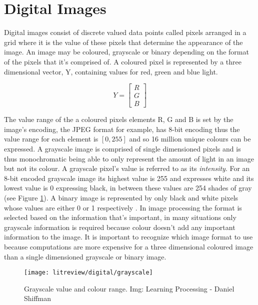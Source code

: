 \section{Digital Images}
\label{section:digital_image}
Digital images consist of discrete valued data points called pixels arranged in a grid where it is the value of these pixels that determine the appearance of the image. An image may be coloured, grayscale or binary depending on the format of the pixels that it's comprised of. A coloured pixel is represented by a three dimensional vector, Y, containing values for red, green and blue light.

\begin{equation}
  Y = \begin{bmatrix}
    R \\ G \\ B
  \end{bmatrix}
\end{equation}

The value range of the a coloured pixels elements R, G and B is set by the image's encoding, the JPEG format for example, has 8-bit encoding thus the value range for each element is $[0, 255]$ and so 16 million unique colours can be expressed. A grayscale image is comprised of single dimensioned pixels and is thus monochromatic being able to only represent the amount of light in an image but not its colour. A grayscale pixel's value is referred to as its \emph{intensity}. For an 8-bit encoded grayscale image its highest value is 255 and expresses white and its lowest value is 0 expressing black, in between these values are 254 shades of gray (see Figure \ref{fig:grayscale}). A binary image is represented by only black and white pixels whose values are either 0 or 1 respectively \cite{learnproc}. In image processing the format is selected based on the information that's important, in many situations only grayscale information is required because colour doesn't add any important information to the image. It is important to recognize which image format to use because computations are more expensive for a three dimensional coloured image than a single dimensioned grayscale or binary image. 

\begin{figure}[H]
  \centering
  \centering\texttt{[image: litreview/digital/grayscale]}
  \caption{Grayscale value and colour range. Img: Learning Processing - Daniel Shiffman}
  \label{fig:grayscale}
\end{figure}

